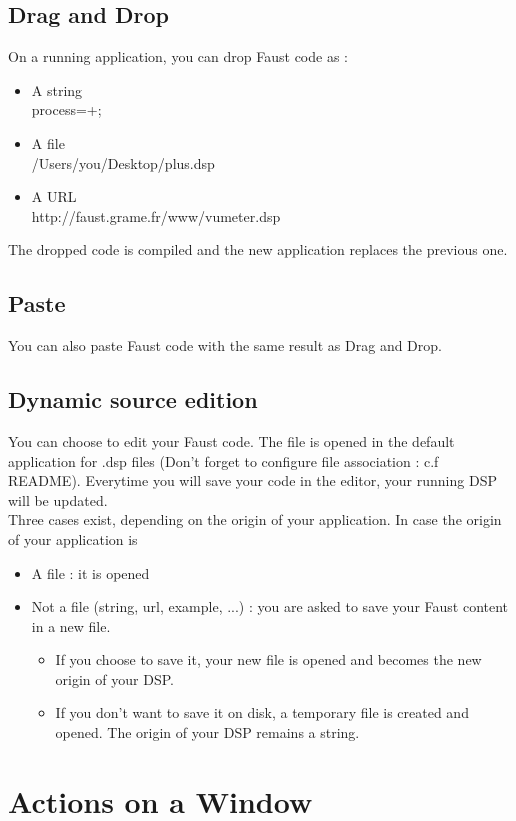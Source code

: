\documentclass[a4paper]{article}
\begin{document}
\subsection{Drag and Drop}
On a running application, you can drop Faust code as :
\begin{itemize}
\item A string \\process=+;
\item A file \\/Users/you/Desktop/plus.dsp
\item A URL \\http://faust.grame.fr/www/vumeter.dsp
\end{itemize}
The dropped code is compiled and the new application replaces the previous one.

\subsection{Paste} 
You can also paste Faust code with the same result as Drag and Drop.

\subsection{Dynamic source edition}
You can choose to edit your Faust code. The file is opened in the default application for .dsp files (Don't forget to configure file association : c.f README). Everytime you will save your code in the editor, your running DSP will be updated. \\

Three cases exist, depending on the origin of your application. In case the origin of your application is
	\begin{itemize}
		\item A file :  it is opened
		\item Not a file (string, url, example, ...) : you are asked to save your Faust content in a new file.
		\begin{itemize}
		\item If you choose to save it, your new file is opened and becomes the new origin of your DSP.
		\item If you don't want to save it on disk, a temporary file is created and opened. The origin of your DSP remains a string.
	\end{itemize}

	\end{itemize}

\section{Actions on a Window}
\end{document}
